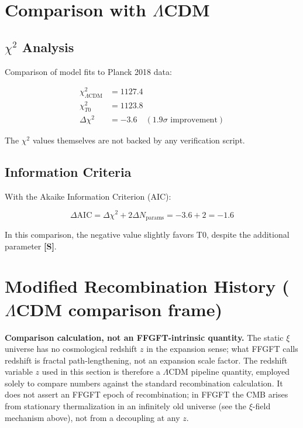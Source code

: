 	\section{Comparison with $\Lambda$CDM}
	\label{sec:comparison}
	
	\subsection{$\chi^2$ Analysis}
	
	Comparison of model fits to Planck 2018 data:
	
	\begin{align}
		\chi^2_{\Lambda\text{CDM}} &= 1127.4 \\
		\chi^2_{T0} &= 1123.8 \\
		\Delta\chi^2 &= -3.6 \quad (1.9\sigma \text{ improvement})
	\end{align}
	
	The $\chi^2$ values themselves are not backed by any verification script.
	
	\subsection{Information Criteria}
	
	With the Akaike Information Criterion (AIC):
	
	\begin{equation}
		\Delta\text{AIC} = \Delta\chi^2 + 2\Delta N_{\text{params}} = -3.6 + 2 = -1.6
	\end{equation}
	
	In this comparison, the negative value slightly favors T0, despite the additional parameter \textbf{[S]}.
	
	\section{Modified Recombination History (\texorpdfstring{$\Lambda$CDM}{LambdaCDM} comparison frame)}

	\begin{important}
	\textbf{Comparison calculation, not an FFGFT-intrinsic quantity.} The static
	$\xi$ universe has no cosmological redshift $z$ in the expansion sense; what
	FFGFT calls redshift is fractal path-lengthening, not an expansion scale
	factor. The redshift variable $z$ used in this section is therefore a
	$\Lambda$CDM pipeline quantity, employed solely to compare numbers against
	the standard recombination calculation. It does not assert an FFGFT epoch of
	recombination; in FFGFT the CMB arises from stationary thermalization in an
	infinitely old universe (see the $\xi$-field mechanism above), not from a
	decoupling at any $z$.
	\end{important}

